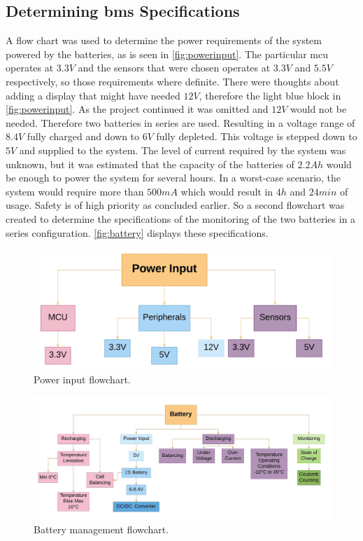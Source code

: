 \subsection{Determining \gls{bms} Specifications}
A flow chart was used to determine the power requirements of the system powered by the batteries, as is seen in \autoref{fig:powerinput}. The particular \gls{mcu} operates at $3.3V$ and the sensors that were chosen operates at $3.3V$ and $5.5V$ respectively, so those requirements where definite. There were thoughts about adding a display that might have needed $12V$, therefore the light blue block in \autoref{fig:powerinput}. As the project continued it was omitted and $12V$ would not be needed. Therefore two batteries in series are used. Resulting in a voltage range of $8.4V$ fully charged and down to $6V$ fully depleted. This voltage is stepped down to $5V$ and supplied to the system.
The level of current required by the system was unknown, but it was estimated that the capacity of the batteries of $2.2Ah$ would be enough to power the system for several hours.
In a worst-case scenario, the system would require  more than $500mA$ which would result in $4h$ and $24min$ of usage.
Safety is of high priority as concluded earlier. So a second flowchart was created to determine the specifications of the monitoring of the two batteries in a series configuration. \autoref{fig:battery} displays these specifications.

\begin{figure}[H]
	\centering
	\includegraphics[width=\textwidth]{Figures/powerinput.png}
	\caption{Power input flowchart.}
	\label{fig:powerinput}
\end{figure}

\begin{figure}[H]
	\centering
	\includegraphics[width=\textwidth]{Figures/battery.jpg}
	\caption{Battery management flowchart.}
	\label{fig:battery}
\end{figure}


